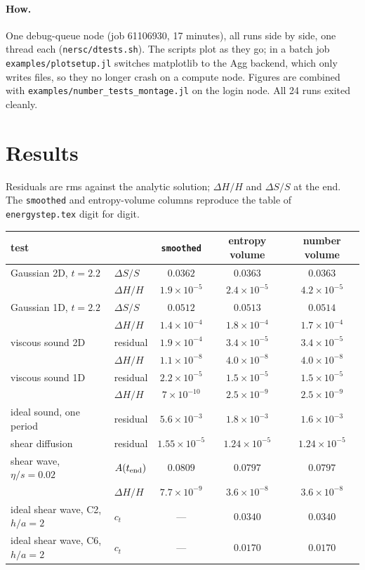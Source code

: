 \documentclass[11pt,aps,preprint,nofootinbib,superscriptaddress,tightenlines]{revtex4-2}
\let\oldparagraph\paragraph
\renewcommand{\paragraph}{\par\bigskip\oldparagraph}
\begin{document}
\paragraph{How.}  One debug-queue node (job 61106930, 17 minutes), all runs side by side,
one thread each (\texttt{nersc/dtests.sh}).  The scripts plot as they go; in a batch job
\texttt{examples/plotsetup.jl} switches matplotlib to the Agg backend, which only writes
files, so they no longer crash on a compute node.  Figures are combined with
\texttt{examples/number\_tests\_montage.jl} on the login node.  All 24 runs exited cleanly.

\section{Results}
\label{sec:results}

Residuals are rms against the analytic solution; $\Delta H/H$ and $\Delta S/S$ at the end.
The \texttt{smoothed} and entropy-volume columns reproduce the table of \texttt{energystep.tex}
digit for digit.
\begin{center}
\begin{tabular}{llccc}
\hline
test & & \texttt{smoothed} & entropy volume & number volume \\ \hline
Gaussian 2D, $t=2.2$ & $\Delta S/S$ & $0.0362$ & $0.0363$ & $0.0363$ \\
 & $\Delta H/H$ & $1.9\times10^{-5}$ & $2.4\times10^{-5}$ & $4.2\times10^{-5}$ \\
Gaussian 1D, $t=2.2$ & $\Delta S/S$ & $0.0512$ & $0.0513$ & $0.0514$ \\
 & $\Delta H/H$ & $1.4\times10^{-4}$ & $1.8\times10^{-4}$ & $1.7\times10^{-4}$ \\
viscous sound 2D & residual & $1.9\times10^{-4}$ & $3.4\times10^{-5}$ & $3.4\times10^{-5}$ \\
 & $\Delta H/H$ & $1.1\times10^{-8}$ & $4.0\times10^{-8}$ & $4.0\times10^{-8}$ \\
viscous sound 1D & residual & $2.2\times10^{-5}$ & $1.5\times10^{-5}$ & $1.5\times10^{-5}$ \\
 & $\Delta H/H$ & $7\times10^{-10}$ & $2.5\times10^{-9}$ & $2.5\times10^{-9}$ \\
ideal sound, one period & residual & $5.6\times10^{-3}$ & $1.8\times10^{-3}$ & $1.6\times10^{-3}$ \\
shear diffusion & residual & $1.55\times10^{-5}$ & $1.24\times10^{-5}$ & $1.24\times10^{-5}$ \\
shear wave, $\eta/s=0.02$ & $A(t_{\rm end})$ & $0.0809$ & $0.0797$ & $0.0797$ \\
 & $\Delta H/H$ & $7.7\times10^{-9}$ & $3.6\times10^{-8}$ & $3.6\times10^{-8}$ \\
ideal shear wave, C2, $h/a=2$ & $c_t$ & --- & $0.0340$ & $0.0340$ \\
ideal shear wave, C6, $h/a=2$ & $c_t$ & --- & $0.0170$ & $0.0170$ \\
\hline
\end{tabular}
\end{center}
\end{document}
